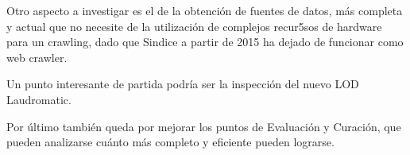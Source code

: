 Otro aspecto a investigar es el de la obtención de fuentes de datos, más completa y actual que
no necesite de la utilización de complejos recur5sos de hardware para un crawling, dado 
que Sindice a partir de 2015 ha dejado de funcionar como web crawler.

Un punto interesante de partida podría ser la inspección del nuevo LOD Laudromatic.

Por último también queda por mejorar los puntos de Evaluación y Curación, que pueden analizarse 
cuánto más completo y eficiente pueden lograrse.
